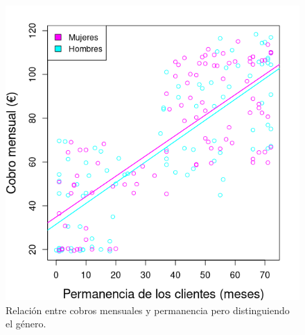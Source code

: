 \documentclass[10pt,a4paper]{article}
\begin{document}
\begin{figure}[!htb]
\begin{minipage}{0.48\textwidth}
     \includegraphics[width=\linewidth]{month-churn-gen}
     \caption{Relación entre cobros mensuales y permanencia pero distinguiendo el género.}\label{fig: month-churn-gen}
   \end{minipage}
\end{figure}
\end{document}
